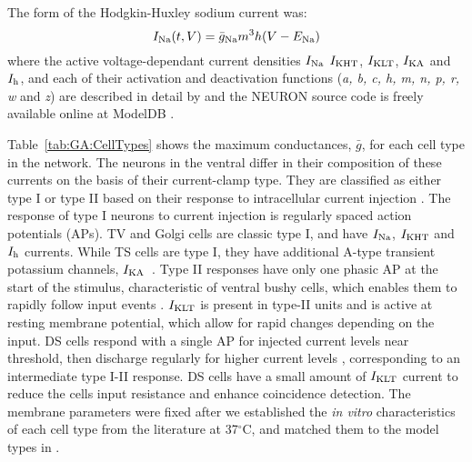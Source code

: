 \smallskip{}

The form of the Hodgkin-Huxley sodium current was:
\begin{equation} \label{eq:GA:10} 
I_{{\rm Na}} (t,V)=\bar{g}_{{\rm Na}} m^{3} h (V-E_{{\rm Na}} )
\end{equation}
\noindent where the active voltage-dependant current densities
$I_{{\rm Na}}$ $I_{{\rm KHT}}$, $I_{{\rm KLT}}$, $I_{{\rm KA}}$ and
$I_{{\rm h}}$, and each of their activation and deactivation functions
(\textit{a, b, c, h, m, n, p, r, w} and \textit{z}) are described in
detail by \citet{RothmanManis:2003} and the NEURON source code is
freely available online at ModelDB \citep{HinesMorseEtAl:2004}.

\smallskip{}

Table~\ref{tab:GA:CellTypes} shows the maximum conductances,
$\bar{g}$, for each cell type in the network.  The neurons in the
ventral {\CN} differ in their composition of these currents on the basis
of their current-clamp type. They are classified as either type I or
type II based on their response to intracellular current injection
\citep{OertelWuEtAl:1988}. The response of type I neurons to current
injection is regularly spaced action potentials (APs). TV
\citep{ZhangOertel:1993b} and Golgi cells
\citep{FerragamoGoldingEtAl:1998a} are classic type I, and have
$I_{{\rm Na}} $, $I_{{\rm KHT}} $ and $I_{{\rm h}} $ currents. While
TS cells are type I, they have additional A-type transient potassium
channels, $I_{{\rm
    KA}}$~\citep{FerragamoGoldingEtAl:1998,RothmanManis:2003b}. Type
II responses have only one phasic AP at the start of the stimulus,
characteristic of ventral {\CN} bushy cells, which enables them to
rapidly follow {\ANF} input events
\citep{OertelWuEtAl:1988,SmithRhode:1989}. $I_{{\rm KLT}} $ is present
in type-II units and is active at resting membrane potential, which
allow for rapid changes depending on the input. DS cells respond with
a single AP for injected current levels near threshold, then discharge
regularly for higher current levels
\citep{OertelWuEtAl:1988,PaoliniClark:1999}, corresponding to an
intermediate type I-II response. DS cells have a small amount of
$I_{{\rm KLT}} $ current to reduce the cells input resistance and
enhance coincidence detection.  The membrane parameters were fixed
after we established the \textit{in vitro} characteristics of each
cell type from the literature
\citep{FerragamoGoldingEtAl:1998,FerragamoGoldingEtAl:1998a,OertelWuEtAl:1988,ZhangOertel:1993b}
at 37$^\circ$C, and matched them to the model types in
\citet{RothmanManis:2003}.

